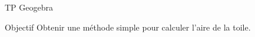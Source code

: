 \documentclass[12pt,oneside]{report}
\begin{document}
\begin{module}[colback=blue!10]{TP Geogebra}
\vspace*{1em}
\begin{center}
\textcolor{blue}{\huge {}}
\end{center}
\vspace*{0.2em}
\end{module}

\begin{spacing}{1.2}



\begin{mybox}[colback=blue!10]{Objectif}
Obtenir une méthode simple pour calculer l'aire de la toile.
\end{mybox}




\end{spacing}
\end{document}
